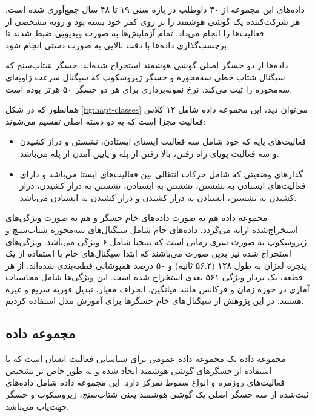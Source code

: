 داده‌های این مجموعه از ۳۰ داوطلب در بازه سنی ۱۹ تا ۴۸ سال جمع‌آوری شده است. هر شرکت‌کننده یک گوشی هوشمند  را بر روی کمر خود بسته بود و رویه مشخصی از فعالیت‌ها را انجام می‌داد. تمام آزمایش‌ها به صورت ویدیویی ضبط شدند تا برچسب‌گذاری داده‌ها با دقت بالایی به صورت دستی انجام شود.

داده‌ها از دو حسگر اصلی گوشی هوشمند استخراج شده‌اند: حسگر شتاب‌سنج که سیگنال شتاب خطی سه‌محوره و حسگر ژیروسکوپ که سیگنال سرعت زاویه‌ای سه‌محوره را ثبت می‌کند. نرخ نمونه‌برداری برای هر دو حسگر ۵۰ هرتز بوده است.

همانطور که در شکل \ref{fig:hapt-classes}
می‌توان دید، این مجموعه داده شامل ۱۲ کلاس فعالیت مجزا است که به دو دسته اصلی تقسیم می‌شوند:
\begin{itemize}
    \item فعالیت‌های پایه که خود شامل سه فعالیت ایستای ایستادن، نشستن و دراز کشیدن و سه فعالیت پویای راه رفتن، بالا رفتن از پله و پایین آمدن از پله می‌باشد.
    \item گذارهای وضعیتی که شامل حرکات انتقالی بین فعالیت‌های ایستا می‌باشد و دارای فعالیت‌های ایستادن به نشستن، نشستن به ایستادن، نشستن به دراز کشیدن، دراز کشیدن به نشستن، ایستادن به دراز کشیدن و دراز کشیدن به ایستادن می‌باشد.
\end{itemize}

مجموعه داده  هم به صورت داده‌های خام حسگر و هم به صورت ویژگی‌های استخراج‌شده ارائه می‌گردد. داده‌های خام شامل سیگنال‌های سه‌محوره شتاب‌سنج و ژیروسکوپ به صورت سری زمانی است که نتیجتا شامل ۶ ویژگی می‌باشد. ویژگی‌های استخراج شده نیز بدین صورت می‌باشند که ابتدا سیگنال‌های خام با استفاده از یک پنجره لغزان به طول ۱۲۸ (۵۶.۲ ثانیه) و ۵۰ درصد همپوشانی قطعه‌بندی شده‌اند. از هر قطعه، یک بردار ویژگی ۵۶۱ بعدی استخراج شده است. این ویژگی‌ها شامل محاسبات آماری در حوزه زمان و فرکانس مانند میانگین، انحراف معیار، تبدیل فوریه سریع و غیره هستند. در این پژوهش از سیگنال‌های خام حسگرها برای آموزش مدل استفاده کردیم.

\subsection{مجموعه داده }

مجموعه داده 
یک مجموعه داده عمومی برای شناسایی فعالیت انسان  است که با استفاده از حسگرهای گوشی هوشمند ایجاد شده و به طور خاص بر تشخیص فعالیت‌های روزمره و انواع سقوط
تمرکز دارد. این مجموعه داده شامل داده‌های ثبت‌شده از سه حسگر اصلی یک گوشی هوشمند 
یعنی شتاب‌سنج، ژیروسکوپ و حسگر جهت‌یاب می‌باشد.

